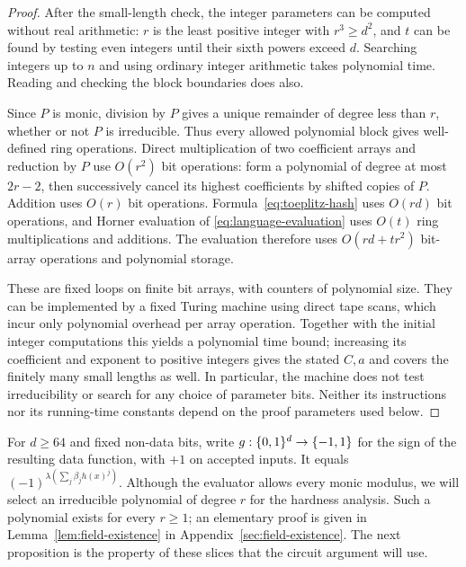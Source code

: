 \begin{proof}
After the small-length check, the integer parameters can be computed
without real arithmetic: $r$ is the least positive integer with
$r^3\ge d^2$, and $t$ can be found by testing even integers until their
sixth powers exceed $d$.  Searching integers up to $n$ and using ordinary
integer arithmetic takes polynomial time.  Reading and checking the
block boundaries does also.

Since $P$ is monic, division by $P$ gives a unique remainder of degree
less than $r$, whether or not $P$ is irreducible.  Thus every allowed
polynomial block gives well-defined ring operations.  Direct multiplication
of two coefficient arrays and reduction by $P$ use $O(r^2)$ bit operations:
form a polynomial of degree at most $2r-2$, then successively cancel its
highest coefficients by shifted copies of $P$.  Addition uses $O(r)$ bit
operations.  Formula~\eqref{eq:toeplitz-hash} uses $O(rd)$ bit operations,
and Horner evaluation of \eqref{eq:language-evaluation} uses $O(t)$ ring
multiplications and additions.  The evaluation therefore uses
$O(rd+tr^2)$ bit-array operations and polynomial storage.

These are fixed loops on finite bit arrays, with counters of polynomial
size.  They can be implemented by a fixed Turing machine using direct tape
scans, which incur only polynomial overhead per array operation.  Together
with the initial integer computations this yields a polynomial time bound;
increasing its coefficient and exponent to positive integers gives the
stated $C,a$ and covers the finitely many small lengths as well.  In
particular, the machine does not test irreducibility or search for any
choice of parameter bits.  Neither its instructions nor its running-time
constants depend on the proof parameters used below.
\end{proof}

For $d\ge64$ and fixed non-data bits, write $g:\{0,1\}^d\to\{-1,1\}$ for
the sign of the resulting data function, with $+1$ on accepted inputs.
It equals $(-1)^{\lambda(\sum_j\beta_jh(x)^j)}$.
Although the evaluator allows every monic modulus, we will select an
irreducible polynomial of degree $r$ for the hardness analysis.  Such a
polynomial exists for every $r\ge1$; an elementary proof is given in
Lemma~\ref{lem:field-existence} in Appendix~\ref{sec:field-existence}.
The next proposition is the property of these slices that the circuit
argument will use.

